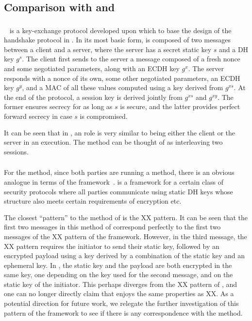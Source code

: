 \subsection{Comparison with \mOptls and \mNoise}
\subsubsection{\mOptls}
\mOptls~\cite{cryptoeprint:2015:978} is a key-exchange protocol developed upon which to base the design of the handshake protocol in . In its most basic form, \mOptls is composed of two messages between a client and a server, where the server has a secret static key $s$ and a DH key $g^{s}$. The client first sends to the server a message composed of a fresh nonce and some negotiated parameters, along with an ECDH key $g^{x}$. The server responds with a nonce of its own, some other negotiated parameters, an ECDH key $g^{y}$, and a MAC of all these values computed using a key derived from $g^{xs}$. At the end of the protocol, a session key is derived jointly from $g^{xs}$ and $g^{xy}$. The former ensures secrecy for as long as $s$ is secure, and the latter provides perfect forward secrecy in case $s$ is compromised.

It can be seen that in \mEdhoc, an \mStat role is very similar to being either the client or the server in an \mOptls execution. The \mStatStat method can be thought of as interleaving two \mOptls sessions. 

\subsubsection{\mNoise}
For the \mStatStat method, since both parties are running a \mStat method, there is an obvious analogue in terms of the \mNoise framework~\cite{perrin2016noise}. \mNoise is a framework for a certain class of security protocols where all parties communicate using static DH keys whose structure also meets certain requirements of encryption etc. 

The closest \mNoise ``pattern'' to the \mStatStat method of \mEdhoc is the XX pattern. It can be seen that the first two messages in this method of \mEdhoc correspond perfectly to the first two messages of the XX pattern of the \mNoise framework. However, in the third message, the XX pattern requires the initiator to send their static key, followed by an encrypted payload using a key derived by a combination of the static key and an ephemeral key. In \mEdhoc, the static key and the payload are both encrypted in the same key, one depending on the key used for the second message, and on the static key of the initiator. This perhaps diverges from the XX pattern of \mNoise, and one can no longer directly claim that \mEdhoc enjoys the same properties as XX. As a potential direction for future work, we relegate the further investigation of this pattern of the \mNoise framework to see if there is any correspondence with the \mStatStat method.

